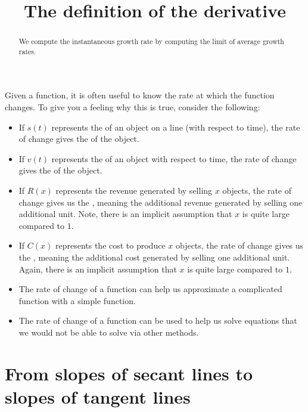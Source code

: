 \documentclass{ximera}
\title[Dig-In:]{The definition of the derivative}
\begin{document}
\begin{abstract}
We compute the instantaneous growth rate by computing the limit of
average growth rates.
\end{abstract}
\maketitle


Given a function, it is often useful to know the rate at which the
function changes. To give you a feeling why this is true, consider the
following:
\begin{itemize}
 
\item If $s(t)$ represents the  of an object on a line (with respect to time), the rate of change gives
  the  of the object.
\item If $v(t)$ represents the  of an object with respect to
  time, the rate of change gives the  of the object.
\item If $R(x)$ represents the revenue generated by selling $x$
  objects, the rate of change gives us the ,
  meaning the additional revenue generated by selling one additional
  unit. Note, there is an implicit assumption that $x$ is quite large
  compared to $1$.
\item If $C(x)$ represents the cost to produce $x$ objects, the rate
  of change gives us the , meaning the
  additional cost generated by selling one additional unit. Again,
  there is an implicit assumption that $x$ is quite large compared to
  $1$.
\item The rate of change of a function can help us approximate a
  complicated function with a simple function.
\item The rate of change of a function can be used to help us solve
  equations that we would not be able to solve via other methods.
\end{itemize}



\section{From slopes of secant lines to slopes of tangent lines}
\end{document}
